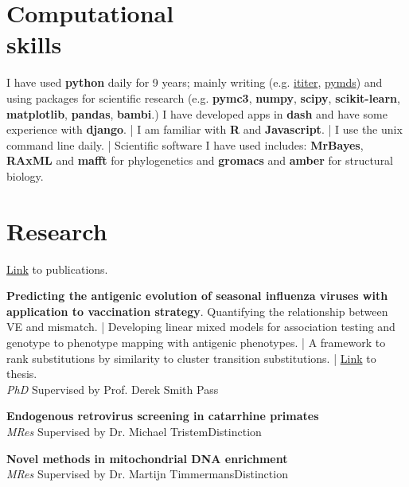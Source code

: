 \documentclass[margin]{res}
\begin{document}
\begin{resume}
	\section{Computational\\skills}

	I have used \textbf{python} daily for 9 years; mainly writing (e.g. \href{https://ititer.readthedocs.io/}{ititer}, \href{https://pymds.readthedocs.io}{pymds}) and using packages for scientific research (e.g. \textbf{pymc3}, \textbf{numpy}, \textbf{scipy}, \textbf{scikit-learn}, \textbf{matplotlib}, \textbf{pandas}, \textbf{bambi}.) I have developed apps in \textbf{dash} and have some experience with \textbf{django}.
	|
	I am familiar with \textbf{R} and \textbf{Javascript}.
	|
	I use the unix command line daily.
	|
	Scientific software I have used includes: \textbf{MrBayes}, \textbf{RAxML} and \textbf{mafft} for phylogenetics and \textbf{gromacs} and \textbf{amber} for structural biology.

	\section{Research}

    \href{https://scholar.google.co.uk/citations?user=q260RVcAAAAJ&hl=en}{Link} to publications.

	\textbf{Predicting the antigenic evolution of seasonal influenza viruses with application to vaccination strategy}.
	Quantifying the relationship between VE and mismatch.
	|
	Developing linear mixed models for association testing and genotype to phenotype mapping with antigenic phenotypes.
	|
	A framework to rank substitutions by similarity to cluster transition substitutions.
    |
    \href{https://www.repository.cam.ac.uk/handle/1810/304119}{Link} to thesis.
    \\
	{\sl PhD} \hfill Supervised by Prof. Derek Smith \hfill Pass

	\textbf{Endogenous retrovirus screening in catarrhine primates}\\
	{\sl MRes} \hfill Supervised by Dr. Michael Tristem\hfill Distinction

	\textbf{Novel methods in mitochondrial DNA enrichment}\\
	{\sl MRes} \hfill Supervised by Dr. Martijn Timmermans\hfill Distinction


\end{resume}
\end{document}
